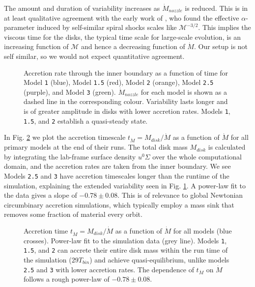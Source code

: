 \documentclass{emulateapj}
\newcommand{\al}{\alpha}
\newcommand{\Sig}{\Sigma}
\newcommand{\model}[1]{{Model \texttt{#1}}}
\begin{document}
The amount and duration of variability increases as $\dot{M}_{nozzle}$ is reduced.  This is in at least qualitative agreement with the early work of \cite{Spruit87}, who found the effective $\al$-parameter induced by self-similar spiral shocks scales like $\mathcal{M}^{-3/2}$.  This implies the viscous time for the disks, the typical time scale for large-scale evolution, is an increasing function of $\mathcal{M}$ and hence a decreasing function of $\dot{M}$.  Our setup is not self similar, so we would not expect quantitative agreement.

\begin{figure}
\caption{\label{fi:mdot_all} Accretion rate through the inner boundary as a function of time for \model{1} (blue), \model{1.5} (red), \model{2} (orange), \model{2.5} (purple), and \model{3} (green).  $\dot{M}_{nozzle}$ for each model is shown as a dashed line in the corresponding colour. Variability lasts longer and is of greater amplitude in disks with lower accretion rates.  Models \texttt{1}, \texttt{1.5}, and \texttt{2} establish a quasi-steady state.}
\end{figure}

In Fig. \ref{fi:tacc} we plot the accretion timescale $t_{\dot{M}} = M_{disk} / \dot{M}$ as a function of $\dot{M}$ for all primary models at the end of their runs.  The total disk mass $M_{disk}$ is calculated by integrating the lab-frame surface density $u^0 \Sig$ over the whole computational domain, and the accretion rates are taken from the inner boundary.  We see Models \texttt{2.5} and \texttt{3} have accretion timescales longer than the runtime of the simulation, explaining the extended variability seen in Fig. \ref{fi:mdot_all}.  A power-law fit to the data gives a slope of $-0.78 \pm 0.08$. This is of relevance to global Newtonian circumbinary accretion simulations, which typically employ a mass sink that removes some fraction of material every orbit.

\begin{figure}
\caption{\label{fi:tacc} Accretion time $t_{\dot{M}}=M_{disk}/\dot{M}$ as a function of $\dot{M}$ for all models (blue crosses). Power-law fit to the simulation data (grey line).  Models \texttt{1}, \texttt{1.5}, and \texttt{2} can accrete their entire disk mass within the run time of the simulation ($29 T_{bin}$) and achieve quasi-equilibrium, unlike models \texttt{2.5} and \texttt{3} with lower accretion rates. The dependence of $t_{\dot{M}}$ on $\dot{M}$ follows a rough power-law of $-0.78 \pm 0.08$.}
\end{figure}
\end{document}
